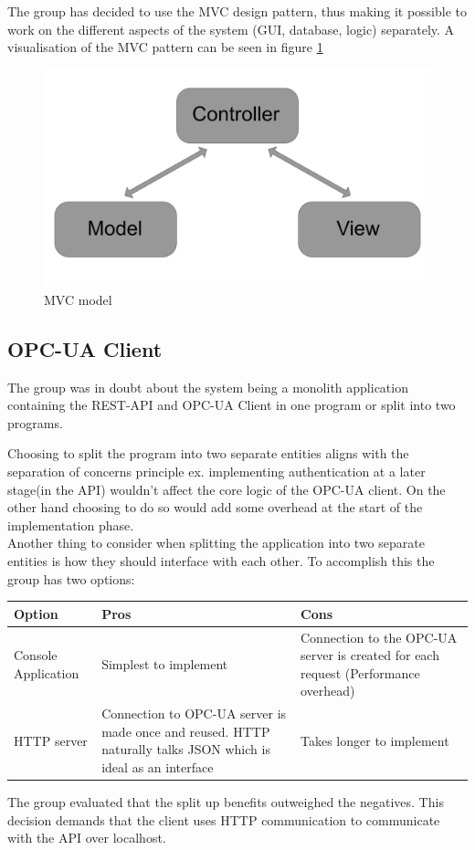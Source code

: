 The group has decided to use the MVC design pattern, thus making it possible to
work on the different aspects of the system (GUI, database, logic) separately. 
A visualisation of the MVC pattern can be seen in figure \ref{figure:MVC_model}

\begin{figure}[H]
    \centering
    \includegraphics[scale=0.15]{images/MVC_model.png}
    \caption{MVC model}
    \label{figure:MVC_model}
\end{figure}

\subsection{OPC-UA Client}
The group was in doubt about the system being a monolith application containing 
the REST-API and OPC-UA Client in one program or split into two programs.

Choosing to split the program into two separate entities aligns with the 
separation of concerns principle ex. implementing authentication at a later 
stage(in the API) wouldn't affect the core logic of the OPC-UA client. On the 
other hand choosing to do so would add some overhead at the start of the 
implementation phase. \\

Another thing to consider when splitting the application into two separate 
entities is how they should interface with each other. To accomplish this the 
group has two options: 

\begin{table}[ht]
    \begin{tabularx}{\textwidth}{|>{\RaggedRight}X|>{\RaggedRight}X|>{\RaggedRight}X|}
        \hline
        \textbf{Option} & \textbf{Pros} & \textbf{Cons} \\
        \hline
        Console Application & Simplest to implement & Connection to the OPC-UA 
        server is created for each request (Performance overhead)\\
        \hline
        HTTP server & Connection to OPC-UA server is made once and reused. HTTP
        naturally talks JSON which is ideal as an interface & Takes longer to 
        implement \\
        \hline
    \end{tabularx}
    \label{someLabel}
\end{table}

The group evaluated that the split up benefits outweighed the negatives. This 
decision demands that the client uses HTTP communication to communicate with the
API over localhost. 
